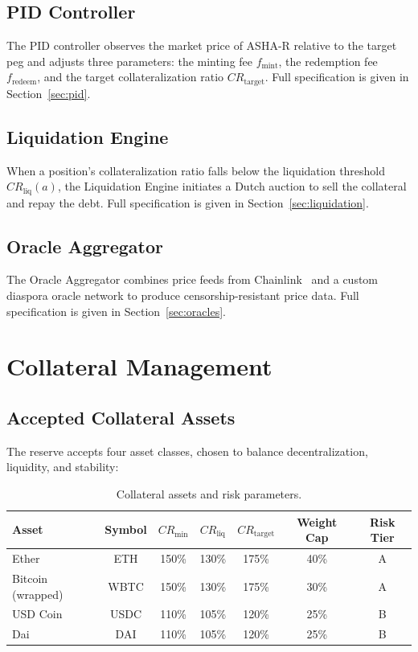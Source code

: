 \documentclass[11pt,a4paper]{article}
\newcommand{\ashares}{\textsc{ASHA-R}\xspace}
\newcommand{\CR}{\mathit{CR}}
\begin{document}
\subsection{PID Controller}

The PID controller observes the market price of \ashares relative to the target peg and adjusts three parameters: the minting fee $f_{\text{mint}}$, the redemption fee $f_{\text{redeem}}$, and the target collateralization ratio $\CR_{\text{target}}$.
Full specification is given in Section~\ref{sec:pid}.

\subsection{Liquidation Engine}

When a position's collateralization ratio falls below the liquidation threshold $\CR_{\text{liq}}(a)$, the Liquidation Engine initiates a Dutch auction to sell the collateral and repay the debt.
Full specification is given in Section~\ref{sec:liquidation}.

\subsection{Oracle Aggregator}

The Oracle Aggregator combines price feeds from Chainlink~\citep{chainlink2021} and a custom diaspora oracle network to produce censorship-resistant price data.
Full specification is given in Section~\ref{sec:oracles}.

\section{Collateral Management}
\label{sec:collateral}

\subsection{Accepted Collateral Assets}

The reserve accepts four asset classes, chosen to balance decentralization, liquidity, and stability:

\begin{table}[H]
\centering
\caption{Collateral assets and risk parameters.}
\label{tab:collateral}
\begin{tabular}{@{}lcccccc@{}}
\toprule
\textbf{Asset} & \textbf{Symbol} & $\CR_{\min}$ & $\CR_{\text{liq}}$ & $\CR_{\text{target}}$ & \textbf{Weight Cap} & \textbf{Risk Tier} \\
\midrule
Ether        & ETH  & 150\% & 130\% & 175\% & 40\% & A \\
Bitcoin (wrapped) & WBTC & 150\% & 130\% & 175\% & 30\% & A \\
USD Coin     & USDC & 110\% & 105\% & 120\% & 25\% & B \\
Dai          & DAI  & 110\% & 105\% & 120\% & 25\% & B \\
\bottomrule
\end{tabular}
\end{table}
\end{document}
